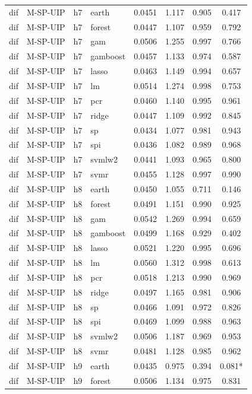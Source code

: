 \begin{ThreePartTable}
\begin{longtable}[t]{llclcccc}
dif & M-SP-UIP & h7 & earth & 0.0451 & 1.117 & 0.905 & 0.417\\
dif & M-SP-UIP & h7 & forest & 0.0447 & 1.107 & 0.959 & 0.792\\
dif & M-SP-UIP & h7 & gam & 0.0506 & 1.255 & 0.997 & 0.766\\
dif & M-SP-UIP & h7 & gamboost & 0.0457 & 1.133 & 0.974 & 0.587\\
dif & M-SP-UIP & h7 & lasso & 0.0463 & 1.149 & 0.994 & 0.657\\
dif & M-SP-UIP & h7 & lm & 0.0514 & 1.274 & 0.998 & 0.753\\
dif & M-SP-UIP & h7 & pcr & 0.0460 & 1.140 & 0.995 & 0.961\\
dif & M-SP-UIP & h7 & ridge & 0.0447 & 1.109 & 0.992 & 0.845\\
dif & M-SP-UIP & h7 & sp & 0.0434 & 1.077 & 0.981 & 0.943\\
dif & M-SP-UIP & h7 & spi & 0.0436 & 1.082 & 0.989 & 0.968\\
dif & M-SP-UIP & h7 & svmlw2 & 0.0441 & 1.093 & 0.965 & 0.800\\
dif & M-SP-UIP & h7 & svmr & 0.0455 & 1.128 & 0.997 & 0.990\\
\addlinespace
dif & M-SP-UIP & h8 & earth & 0.0450 & 1.055 & 0.711 & 0.146\\
dif & M-SP-UIP & h8 & forest & 0.0491 & 1.151 & 0.990 & 0.925\\
dif & M-SP-UIP & h8 & gam & 0.0542 & 1.269 & 0.994 & 0.659\\
dif & M-SP-UIP & h8 & gamboost & 0.0499 & 1.168 & 0.929 & 0.402\\
dif & M-SP-UIP & h8 & lasso & 0.0521 & 1.220 & 0.995 & 0.696\\
dif & M-SP-UIP & h8 & lm & 0.0560 & 1.312 & 0.998 & 0.613\\
dif & M-SP-UIP & h8 & pcr & 0.0518 & 1.213 & 0.990 & 0.969\\
dif & M-SP-UIP & h8 & ridge & 0.0497 & 1.165 & 0.981 & 0.906\\
dif & M-SP-UIP & h8 & sp & 0.0466 & 1.091 & 0.972 & 0.826\\
dif & M-SP-UIP & h8 & spi & 0.0469 & 1.099 & 0.988 & 0.963\\
dif & M-SP-UIP & h8 & svmlw2 & 0.0506 & 1.187 & 0.969 & 0.953\\
dif & M-SP-UIP & h8 & svmr & 0.0481 & 1.128 & 0.985 & 0.962\\
\addlinespace
dif & M-SP-UIP & h9 & earth & 0.0435 & 0.975 & 0.394 & 0.081*\\
dif & M-SP-UIP & h9 & forest & 0.0506 & 1.134 & 0.975 & 0.831\\

\end{longtable}
\end{ThreePartTable}
